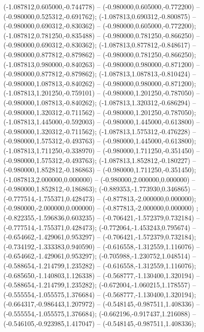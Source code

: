  (-1.087812,0.605000,-0.744778) -- (-0.980000,0.605000,-0.772200) -- (-0.980000,0.525312,-0.691762);
 (-1.087813,0.690312,-0.800875) -- (-0.980000,0.690312,-0.830362) -- (-0.980000,0.605000,-0.772200);
 (-1.087812,0.781250,-0.835488) -- (-0.980000,0.781250,-0.866250) -- (-0.980000,0.690312,-0.830362);
 (-1.087813,0.877812,-0.848617) -- (-0.980000,0.877812,-0.879862) -- (-0.980000,0.781250,-0.866250);
 (-1.087813,0.980000,-0.840263) -- (-0.980000,0.980000,-0.871200) -- (-0.980000,0.877812,-0.879862);
 (-1.087813,1.087813,-0.810424) -- (-0.980000,1.087813,-0.840262) -- (-0.980000,0.980000,-0.871200);
 (-1.087813,1.201250,-0.759101) -- (-0.980000,1.201250,-0.787050) -- (-0.980000,1.087813,-0.840262);
 (-1.087813,1.320312,-0.686294) -- (-0.980000,1.320312,-0.711562) -- (-0.980000,1.201250,-0.787050);
 (-1.087813,1.445000,-0.592003) -- (-0.980000,1.445000,-0.613800) -- (-0.980000,1.320312,-0.711562);
 (-1.087813,1.575312,-0.476228) -- (-0.980000,1.575312,-0.493763) -- (-0.980000,1.445000,-0.613800);
 (-1.087813,1.711250,-0.338970) -- (-0.980000,1.711250,-0.351450) -- (-0.980000,1.575312,-0.493763);
 (-1.087813,1.852812,-0.180227) -- (-0.980000,1.852812,-0.186863) -- (-0.980000,1.711250,-0.351450);
 (-1.087813,2.000000,0.000000) -- (-0.980000,2.000000,0.000000) -- (-0.980000,1.852812,-0.186863);
 (-0.889353,-1.773930,0.346865) -- (-0.777514,-1.755371,0.428473) -- (-0.877813,-2.000000,0.000000);
 (-0.980000,-2.000000,0.000000) -- (-0.877813,-2.000000,0.000000) ;
 (-0.822355,-1.596836,0.603235) -- (-0.706421,-1.572379,0.732184) -- (-0.777514,-1.755371,0.428473);
 (-0.772064,-1.453243,0.795674) -- (-0.654662,-1.429061,0.953297) -- (-0.706421,-1.572379,0.732184);
 (-0.734192,-1.333383,0.940590) -- (-0.616558,-1.312559,1.116076) -- (-0.654662,-1.429061,0.953297);
 (-0.705988,-1.230752,1.048514) -- (-0.588654,-1.214799,1.235282) -- (-0.616558,-1.312559,1.116076);
 (-0.685650,-1.140803,1.126338) -- (-0.568777,-1.130400,1.320194) -- (-0.588654,-1.214799,1.235282);
 (-0.672004,-1.060215,1.178557) -- (-0.555554,-1.055575,1.376684) -- (-0.568777,-1.130400,1.320194);
 (-0.664317,-0.986443,1.207972) -- (-0.548145,-0.987511,1.408336) -- (-0.555554,-1.055575,1.376684);
 (-0.662196,-0.917437,1.216088) -- (-0.546105,-0.923985,1.417047) -- (-0.548145,-0.987511,1.408336);
